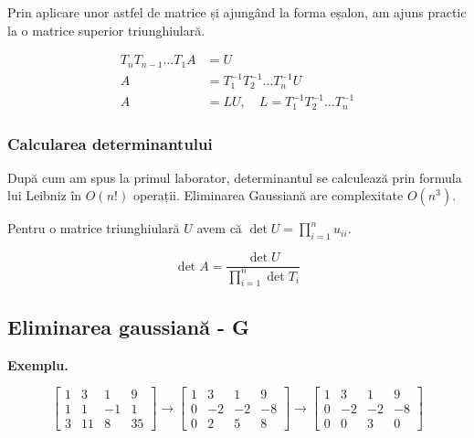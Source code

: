 \documentclass{exam}
\begin{document}
\par Prin aplicare unor astfel de matrice și ajungând la forma eșalon, am ajuns
practic la o matrice superior triunghiulară.

\begin{align*}
	T_nT_{n-1}\ldots T_1 A & = U                                             \\
	A                      & = T_1^{-1}T_2^{-1}\ldots T_n^{-1}U              \\
	A                      & = LU, \quad L = T_1^{-1}T_2^{-1}\ldots T_n^{-1}
\end{align*}

\subsubsection{Calcularea determinantului}

\par După cum am spus la primul laborator, determinantul se calculează prin
formula lui Leibniz în $O(n!)$ operații. Eliminarea Gaussiană are complexitate
$O(n^3)$.

\par Pentru o matrice triunghiulară $U$ avem că $\det U = \prod_{i=1}^{n} u_{ii}$.

\begin{equation*}
	\det A = \frac{\det U}{\prod_{i = 1}^{n} \det T_i}
\end{equation*}

\subsection{Eliminarea gaussiană - G}

\par \textbf{Exemplu.}

\begin{equation*}
	\begin{bmatrix}
		1 & 3  & 1  & 9  \\
		1 & 1  & -1 & 1  \\
		3 & 11 & 8  & 35
	\end{bmatrix} \to
	\begin{bmatrix}
		1 & 3  & 1  & 9  \\
		0 & -2 & -2 & -8 \\
		0 & 2  & 5  & 8
	\end{bmatrix} \to
	\begin{bmatrix}
		1 & 3  & 1  & 9  \\
		0 & -2 & -2 & -8 \\
		0 & 0  & 3  & 0
	\end{bmatrix}
\end{equation*}
\end{document}
